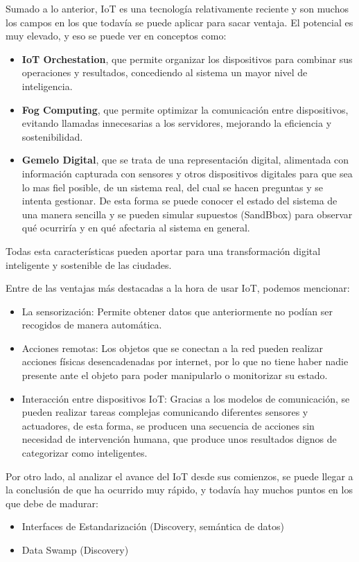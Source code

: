 \documentclass[12pt, a4paper, twoside]{article}
\begin{document}
Sumado a lo anterior, IoT es una tecnología relativamente reciente y son muchos los campos en los que 
todavía se puede aplicar para sacar ventaja. El potencial es muy elevado, y eso se puede ver en
conceptos como:
\begin{itemize}
  \item \textbf{IoT Orchestation}, que permite organizar los dispositivos para combinar sus operaciones
  y resultados, concediendo al sistema un mayor nivel de inteligencia.
  \item \textbf{Fog Computing}, que permite optimizar la comunicación entre dispositivos, evitando llamadas
  innecesarias a los servidores, mejorando la eficiencia y sostenibilidad.
  \item \textbf{Gemelo Digital}, que se trata de una representación digital, alimentada con información
  capturada con sensores y otros dispositivos digitales para que sea lo mas fiel posible, de un
  sistema real, del cual se hacen preguntas y se intenta gestionar.
  De esta forma se puede conocer el estado del sistema de una manera sencilla y se pueden simular supuestos
  (SandBbox) para observar qué ocurriría y en qué afectaria al sistema en general.
\end{itemize}
Todas esta características pueden aportar para una transformación digital inteligente y sostenible de las ciudades.

Entre de las ventajas más destacadas a la hora de usar IoT, podemos mencionar:
\begin{itemize}
    \item La sensorización: Permite obtener datos que anteriormente no podían ser recogidos de manera automática.
    \item Acciones remotas: Los objetos que se conectan a la red pueden realizar acciones físicas desencadenadas por internet,
      por lo que no tiene haber nadie presente ante el objeto para poder manipularlo o monitorizar su estado.
    \item Interacción entre dispositivos IoT: Gracias a los modelos de comunicación, se pueden realizar tareas complejas
      comunicando diferentes sensores y actuadores, de esta forma, se producen una secuencia de acciones sin necesidad
      de intervención humana, que produce unos resultados dignos de categorizar como inteligentes.
\end{itemize}


Por otro lado, al analizar el avance del IoT desde sus comienzos, se puede llegar a la conclusión 
de que ha ocurrido muy rápido, y todavía hay muchos puntos en los que debe de madurar:
\begin{itemize}
  \item Interfaces de Estandarización (Discovery, semántica de datos)
  \item Data Swamp (Discovery)
\end{itemize}
\end{document}
